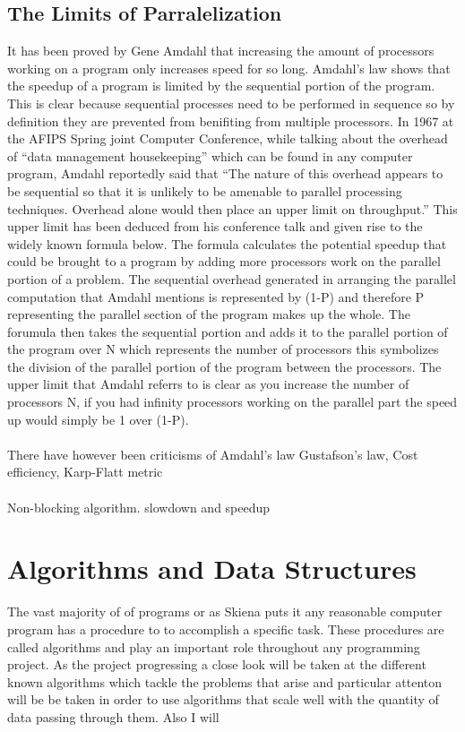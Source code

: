 \documentclass{report}
\begin{document}
\subsection{The Limits of Parralelization}
It has been proved by Gene Amdahl that increasing the amount of processors working on a program only increases speed for so long. Amdahl's law shows that the speedup of a program is limited by the sequential portion of the program. This is clear because sequential processes need to be performed in sequence so by definition they are prevented from benifiting from multiple processors. In 1967 at the AFIPS Spring joint Computer Conference, while talking about the overhead of ``data management housekeeping'' which can be found in any computer program, Amdahl reportedly said that ``The nature of this overhead appears to be sequential so that it is unlikely to be amenable to parallel processing techniques. Overhead alone would then place an upper limit on throughput.''\cite{Amdahl1967} This upper limit has been deduced from his conference talk and given rise to the widely known formula below.
The formula calculates the potential speedup that could be brought to a program by adding more processors work on the parallel portion of a problem. The sequential overhead generated in arranging the parallel computation that Amdahl mentions is represented by (1-P) and therefore P representing the parallel section of the program makes up the whole. The forumula then takes the sequential portion and adds it to the parallel portion of the program over N which represents the number of processors this symbolizes the division of the parallel portion of the program between the processors. The upper limit that Amdahl referrs to is clear as you increase the number of processors N, if you had infinity processors working on the parallel part the speed up would simply be 1 over (1-P).
\cite{Amdahl1967}

\paragraph{}
There have however been criticisms of Amdahl's law
Gustafson's law, Cost efficiency, Karp-Flatt metric

\paragraph{}
Non-blocking algorithm.
slowdown and speedup

\section{Algorithms and Data Structures}
The vast majority of of programs or as Skiena puts it any reasonable computer program has a procedure to to accomplish a specific task. These procedures are called algorithms and play an important role throughout any programming project.\cite{Skiena2010} As the project progressing a close look will be taken at the different known algorithms which tackle the problems that arise and particular attenton will be be taken in order to use algorithms that scale well with the quantity of data passing through them. Also I will 
\end{document}
